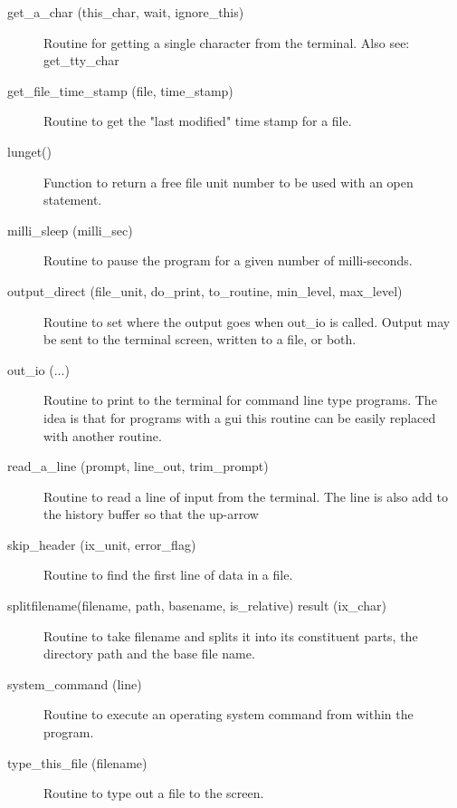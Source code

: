 \begin{description}
\label{r:get.a.char}
\item[get_a_char (this_char, wait, ignore_this)] \Newline 
Routine for getting a single character from the terminal.
Also see: get_tty_char

\label{r:get.file.time.stamp}
\item[get_file_time_stamp (file, time_stamp)] \Newline 
Routine to get the "last modified" time stamp for a file.

\label{r:lunget}
\item[lunget()] \Newline 
Function to return a free file unit number to be used with an open statement.

\label{r:milli.sleep}
\item[milli_sleep (milli_sec)] \Newline 
Routine to pause the program for a given number of milli-seconds.

\label{r:output.direct}
\item[output_direct (file_unit, do_print, to_routine, min_level, max_level)] \Newline 
Routine to set where the output goes when out_io is called.
Output may be sent to the terminal screen, written to a file, or both.

\label{r:out.io}
\item[out_io (...)] \Newline 
Routine to print to the terminal for command line type programs.
The idea is that for programs with a gui this routine can be easily
replaced with another routine.

\label{r:read.a.line}
\item[read_a_line (prompt, line_out, trim_prompt)] \Newline 
Routine to read a line of input from the terminal.
The line is also add to the history buffer so that the up-arrow

\label{r:skip.header}
\item[skip_header (ix_unit, error_flag)] \Newline 
Routine to find the first line of data in a file. 

\label{r:splitfilename}
\item[splitfilename(filename, path, basename, is_relative) result (ix_char)] \Newline 
Routine to take filename and splits it into its constituent parts, 
the directory path and the base file name.  

\label{r:system.command}
\item[system_command (line)] \Newline 
Routine to execute an operating system command from within the program.

\label{r:type.this.file}
\item[type_this_file (filename)] \Newline 
Routine to type out a file to the screen.

\end{description}

